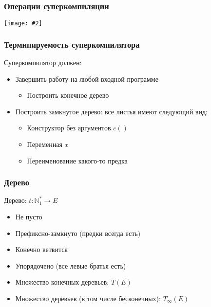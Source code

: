 \documentclass{beamer}
\newcommand{\incimage}[2][0.8]{ 
  \begin{center}   
    \texttt{[image: \#2]}
  \end{center}
  }
\begin{document}
\begin{frame}[fragile]
  \transwipe[direction=90]
  \frametitle{Операции суперкомпиляции}


    \incimage{supercompilation.png}

\end{frame}

\begin{frame}[fragile]
  \transwipe[direction=90]
  \frametitle{Терминируемость суперкомпилятора}

Суперкомпилятор должен:

\begin{itemize}
  \item Завершить работу на любой входной программе
  \begin{itemize}
    \item Построить конечное дерево
  \end{itemize}
  \item Построить замкнутое дерево: все листья имеют следующий вид:
  \begin{itemize}
    \item Конструктор без аргументов $c()$
    \item Переменная $x$
    \item Переименование какого-то предка
  \end{itemize}
\end{itemize}   

\end{frame}


\begin{frame}[fragile]
  \transwipe[direction=90]
  \frametitle{Дерево}


  Дерево: $t : \mathbb{N}^*_1 \to E$

  \begin{itemize}
    \item Не пусто 
    \item Префиксно-замкнуто (предки всегда есть)
    \item Конечно ветвится
    \item Упорядочено (все левые братья есть)
  \end{itemize}


  \begin{itemize}
    \item Множество конечных деревьев: $T(E)$
    \item Множество деревьев (в том числе бесконечных): $T_{\infty}(E)$
  \end{itemize}
  

  

\end{frame}
\end{document}

